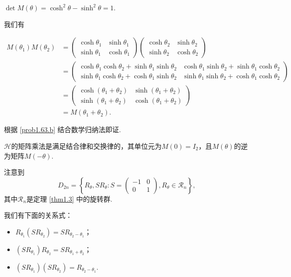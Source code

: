 \begin{solution}
  \begin{enuma}
    \item $\det M(\theta)=\cosh^2\theta-\sinh^2\theta=1$.
    \item 我们有
  \end{enuma}
  \begin{align*}
    M(\theta_1)M(\theta_2) & = \begin{pmatrix}
      \cosh\theta_1 & \sinh\theta_1 \\
      \sinh\theta_1 & \cosh\theta_1
    \end{pmatrix}
     \begin{pmatrix}
      \cosh\theta_2 & \sinh\theta_2 \\
      \sinh\theta_2 & \cosh\theta_2
    \end{pmatrix} \\
    & = \begin{pmatrix}
      \cosh\theta_1\cosh\theta_2 + \sinh\theta_1\sinh\theta_2
       & \cosh\theta_1\sinh\theta_2 + \sinh\theta_1\cosh\theta_2 \\
      \sinh\theta_1\cosh\theta_2 + \cosh\theta_1\sinh\theta_2
       & \sinh\theta_1\sinh\theta_2 + \cosh\theta_1\cosh\theta_2
    \end{pmatrix} \\
    & = \begin{pmatrix}
      \cosh(\theta_1+\theta_2) & \sinh(\theta_1+\theta_2) \\
      \sinh(\theta_1+\theta_2) & \cosh(\theta_1+\theta_2)
    \end{pmatrix} \\
    & = M(\theta_1+\theta_2).
  \end{align*}

  \begin{enuma}
    \setcounter{enumi}{2}
    \item 根据 \ref{prob1.63.b} 结合数学归纳法即证.
    \item $\mathscr H$的矩阵乘法是满足结合律和交换律的，其单位元为$M(0)=I_2$，且$M(\theta)$的逆为矩阵$M(-\theta)$.
  \end{enuma}
\end{solution}

\begin{solution}
  注意到
  \[
    D_{2n} = \left\{ R_\theta,SR_\theta:S=
    \begin{pmatrix}
      -1 & 0 \\ 0 & 1
    \end{pmatrix},R_\theta\in\mathscr R_n \right\},
  \]
  其中$\mathscr R_n$是定理 \ref{thm1.3} 中的旋转群.

  我们有下面的关系式：
  \begin{itemize}
    \item $R_{\theta_1}(SR_{\theta_2})
        =SR_{\theta_2-\theta_1}$；
    \item $(SR_{\theta_1})R_{\theta_2}
    =SR_{\theta_1+\theta_2}$；
    \item $(SR_{\theta_1})(SR_{\theta_2})=
    R_{\theta_2-\theta_1}$.
  \end{itemize}
\end{solution}

